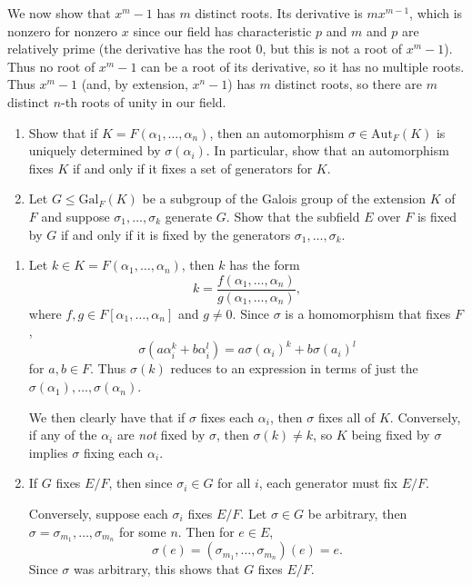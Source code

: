 \documentclass[10pt]{report}
\begin{document}
We now show that $x^m-1$ has $m$ distinct roots. Its derivative is $mx^{m-1}$, which is nonzero for nonzero $x$ since our field has characteristic $p$ and $m$ and $p$ are relatively prime (the derivative has the root 0, but this is not a root of $x^m-1$). Thus no root of $x^m-1$ can be a root of its derivative, so it has no multiple roots. Thus $x^m-1$ (and, by extension, $x^n-1$) has $m$ distinct roots, so there are $m$ distinct $n$-th roots of unity in our field.

\begin{exer}[DF 14.1: 1]
\begin{enumerate}
	\item Show that if $K=F(\alpha_1, \dots, \alpha_n)$, then an automorphism $\sigma \in \text{Aut}_F(K)$ is uniquely determined by $\sigma(\alpha_i)$. In particular, show that an automorphism fixes $K$ if and only if it fixes a set of generators for $K$.

	\item Let $G \leq \text{Gal}_F(K)$ be a subgroup of the Galois group of the extension $K$ of $F$ and suppose $\sigma_1, \dots, \sigma_k$ generate $G$. Show that the subfield $E$ over $F$ is fixed by $G$ if and only if it is fixed by the generators $\sigma_1, \dots, \sigma_k$.
\end{enumerate}
\end{exer}
\begin{enumerate}
	\item Let $k \in K = F(\alpha_1, \dots, \alpha_n)$, then $k$ has the form
		\[
			k = \frac{f(\alpha_1, \dots, \alpha_n)}{g(\alpha_1, \dots, \alpha_n)},
		\] where $f,g \in F[\alpha_1, \dots, \alpha_n]$ and $g \neq 0$. Since $\sigma$ is a homomorphism that fixes $F$,
		\[
			\sigma(a \alpha_i^k + b\alpha_i^{l}) = a \sigma(\alpha_i)^k + b\sigma(a_i)^{l}
		\] for $a,b \in F$. Thus $\sigma(k)$ reduces to an expression in terms of just the $\sigma({\alpha}_1), \dots, \sigma({\alpha}_{n})$.

		We then clearly have that if $\sigma$ fixes each $\alpha_i$, then $\sigma$ fixes all of $K$. Conversely, if any of the $\alpha_i$ are \textit{not} fixed by $\sigma$, then $\sigma(k) \neq k$, so $K$ being fixed by $\sigma$ implies $\sigma$ fixing each $\alpha_i$.

	\item If $G$ fixes $E/F$, then since $\sigma_{i}\in G$ for all $i$, each generator must fix $E/F$.

		Conversely, suppose each $\sigma_i$ fixes $E/F$. Let $\sigma \in G$ be arbitrary, then $\sigma = {\sigma}_{m_1}, \dots, {\sigma}_{m_n}$ for some $n$. Then for $e \in E$,
		\[
			\sigma(e) = ({\sigma}_{m_1}, \dots, {\sigma}_{m_n})(e) = e.
		\] Since $\sigma$ was arbitrary, this shows that $G$ fixes $E/F$.
\end{enumerate}
\end{document}

